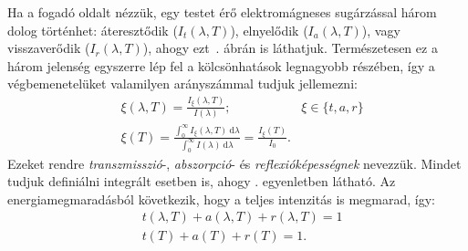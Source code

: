 \documentclass[a4paper, 12pt]{article}
\begin{document}
    Ha a fogadó oldalt nézzük, egy testet érő elektromágneses sugárzással három dolog történhet: áteresztődik ($I_t(\lambda, T)$), elnyelődik ($I_a(\lambda, T)$), vagy visszaverődik ($I_r(\lambda, T)$), ahogy ezt~. ábrán is láthatjuk.
    Természetesen ez a három jelenség egyszerre lép fel a kölcsönhatások legnagyobb részében, így a végbemenetelüket valamilyen arányszámmal tudjuk jellemezni:
    \begin{align}
        &\xi(\lambda, T)=\frac{I_\xi(\lambda, T)}{I(\lambda)}; &\xi\in\{t, a, r\} \\
        &\xi(T)=\frac{\int_{0}^{\infty} I_\xi(\lambda, T)~\mathrm{d}\lambda}{\int_{0}^{\infty} I(\lambda)~\mathrm{d}\lambda}=\frac{I_\xi(T)}{I_0}.\label{eq:0intabs}
    \end{align}
    Ezeket rendre \textit{transzmisszió}-, \textit{abszorpció}- és \textit{reflexióképességnek} nevezzük.
    Mindet tudjuk definiálni integrált esetben is, ahogy . egyenletben látható.
    Az energiamegmaradásból következik, hogy a teljes intenzitás is megmarad, így:
    \begin{align}
        &t(\lambda, T)+a(\lambda, T)+r(\lambda, T)=1 \\
        &t(T)+a(T)+r(T)=1.
    \end{align}
\end{document}
